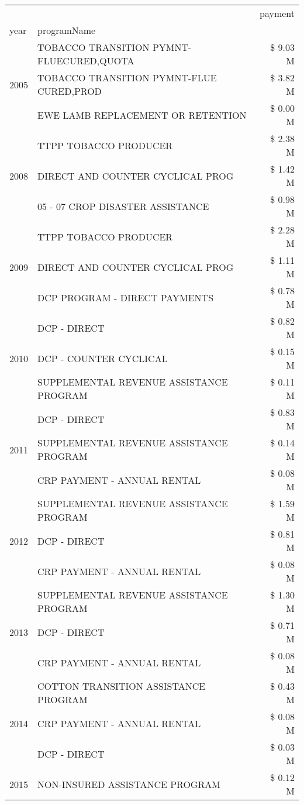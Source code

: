 \begin{tabular}{llr}
\toprule
 &  & payment \\
year & programName &  \\
\midrule
\multirow[t]{3}{*}{2005} & TOBACCO TRANSITION PYMNT-FLUECURED,QUOTA & \$ 9.03 M \\
 & TOBACCO TRANSITION PYMNT-FLUE CURED,PROD & \$ 3.82 M \\
 & EWE LAMB REPLACEMENT OR RETENTION & \$ 0.00 M \\
\cline{1-3}
\multirow[t]{3}{*}{2008} & TTPP TOBACCO PRODUCER & \$ 2.38 M \\
 & DIRECT AND COUNTER CYCLICAL PROG & \$ 1.42 M \\
 & 05 - 07 CROP DISASTER ASSISTANCE & \$ 0.98 M \\
\cline{1-3}
\multirow[t]{3}{*}{2009} & TTPP TOBACCO PRODUCER & \$ 2.28 M \\
 & DIRECT AND COUNTER CYCLICAL PROG & \$ 1.11 M \\
 & DCP PROGRAM - DIRECT PAYMENTS & \$ 0.78 M \\
\cline{1-3}
\multirow[t]{3}{*}{2010} & DCP - DIRECT & \$ 0.82 M \\
 & DCP - COUNTER CYCLICAL & \$ 0.15 M \\
 & SUPPLEMENTAL REVENUE ASSISTANCE PROGRAM & \$ 0.11 M \\
\cline{1-3}
\multirow[t]{3}{*}{2011} & DCP - DIRECT & \$ 0.83 M \\
 & SUPPLEMENTAL REVENUE ASSISTANCE PROGRAM & \$ 0.14 M \\
 & CRP PAYMENT - ANNUAL RENTAL & \$ 0.08 M \\
\cline{1-3}
\multirow[t]{3}{*}{2012} & SUPPLEMENTAL REVENUE ASSISTANCE PROGRAM & \$ 1.59 M \\
 & DCP - DIRECT & \$ 0.81 M \\
 & CRP PAYMENT - ANNUAL RENTAL & \$ 0.08 M \\
\cline{1-3}
\multirow[t]{3}{*}{2013} & SUPPLEMENTAL REVENUE ASSISTANCE PROGRAM & \$ 1.30 M \\
 & DCP - DIRECT & \$ 0.71 M \\
 & CRP PAYMENT - ANNUAL RENTAL & \$ 0.08 M \\
\cline{1-3}
\multirow[t]{3}{*}{2014} & COTTON TRANSITION ASSISTANCE PROGRAM & \$ 0.43 M \\
 & CRP PAYMENT - ANNUAL RENTAL & \$ 0.08 M \\
 & DCP - DIRECT & \$ 0.03 M \\
\cline{1-3}
\multirow[t]{3}{*}{2015} & NON-INSURED ASSISTANCE PROGRAM & \$ 0.12 M \\

\end{tabular}
